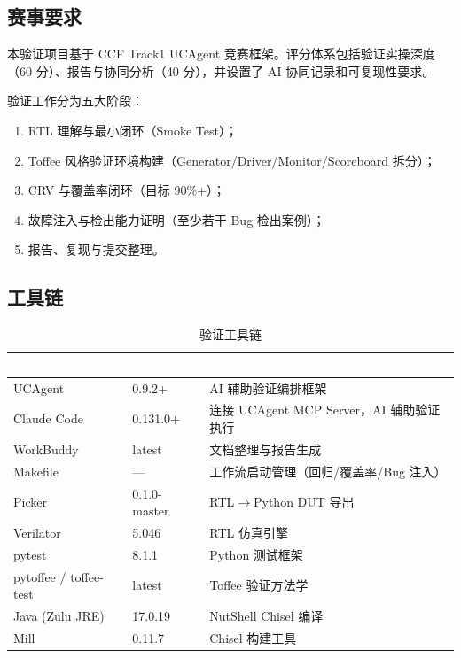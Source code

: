 \documentclass[12pt,a4paper]{ctexart}
\newcommand{\thcell}[1]{\textcolor{white}{\bfseries #1}}
\begin{document}
\subsection{赛事要求}

本验证项目基于 CCF Track1 UCAgent 竞赛框架。评分体系包括验证实操深度（60 分）、报告与协同分析（40 分），并设置了 AI 协同记录和可复现性要求。

验证工作分为五大阶段：
\begin{enumerate}[label=阶段\arabic*：,leftmargin=*]
  \item RTL 理解与最小闭环（Smoke Test）；
  \item Toffee 风格验证环境构建（Generator/Driver/Monitor/Scoreboard 拆分）；
  \item CRV 与覆盖率闭环（目标 90\%+）；
  \item 故障注入与检出能力证明（至少若干 Bug 检出案例）；
  \item 报告、复现与提交整理。
\end{enumerate}

\subsection{工具链}

\begin{table}[H]
\centering
\caption{验证工具链}
\renewcommand{\arraystretch}{1.3}
\begin{tabular}{@{}p{3.5cm}p{3.5cm}p{5cm}@{}}
\toprule
\rowcolor{primaryblue}
\thcell{工具/组件} & \thcell{版本} & \thcell{用途} \\
\midrule
\rowcolor{rowgray} UCAgent & 0.9.2+ & AI 辅助验证编排框架 \\
Claude Code & 0.131.0+ & 连接 UCAgent MCP Server，AI 辅助验证执行 \\
\rowcolor{rowgray} WorkBuddy & latest & 文档整理与报告生成 \\
Makefile & --- & 工作流启动管理（回归/覆盖率/Bug 注入） \\
\rowcolor{rowgray} Picker & 0.1.0-master & RTL$\rightarrow$Python DUT 导出 \\
Verilator & 5.046 & RTL 仿真引擎 \\
\rowcolor{rowgray} pytest & 8.1.1 & Python 测试框架 \\
pytoffee / toffee-test & latest & Toffee 验证方法学 \\
\rowcolor{rowgray} Java (Zulu JRE) & 17.0.19 & NutShell Chisel 编译 \\
Mill & 0.11.7 & Chisel 构建工具 \\
\bottomrule
\end{tabular}
\end{table}
\end{document}
